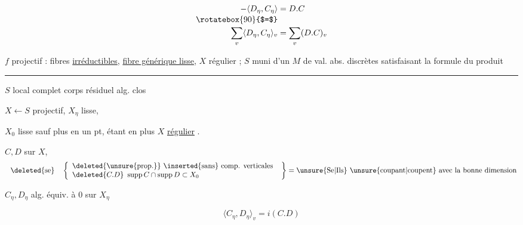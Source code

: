 \[
\begin{aligned}
-\langle D_{\eta},C_{\eta}\rangle&=D.C\\[-2pt]
\rotatebox{90}{$=$}&\\[-2pt]
\sum_v\langle D_{\eta},C_{\eta}\rangle_v&=\sum_v(D.C)_v
\end{aligned}
\]

$f$ projectif : fibres  \uline{irréductibles}, \uline{fibre générique lisse}, $X$ régulier ; $S$ muni d'un  $M$ de val. abs. discrètes satisfaisant la formule du produit

\smallskip\hrule\smallskip

$S$ local complet corps résiduel alg. clos

$X\leftarrow S$ projectif, $X_{\eta}$ lisse,

$X_0$ lisse sauf  plus en un pt,   étant en plus $X$ \uline{régulier} .

$C,D$ sur $X$,
\[
\left.
\begin{array}{l}
\deleted{\text{se}}\quad
\left\{\begin{array}{l}
\deleted{\text{\unsure{prop.}}}\ \text{\inserted{sans} comp. verticales}\\
\deleted{C.D}\ \operatorname{supp} C\cap\operatorname{supp} D\subset X_0
\end{array}\right.
\end{array}
\right\}=\text{\unsure{Se|Ils} \unsure{coupant|coupent} avec la bonne dimension}
\]

$C_{\eta},D_{\eta}$ alg. équiv. à $0$ sur $X_{\eta}$

\[
\boxed{\langle C_{\eta},D_{\eta}\rangle_v=i(C.D)}
\]
